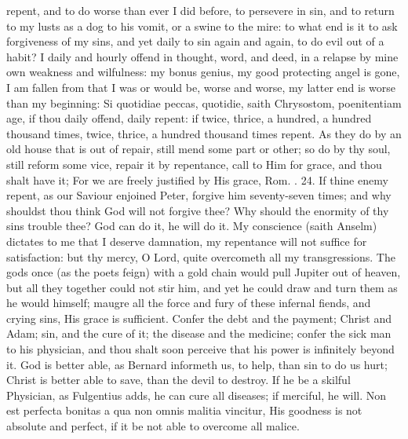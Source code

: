 {repent, and to do worse than ever I did before, to persevere in sin,
and to return to my lusts as a dog to his vomit, or a swine to the
mire: to what end is it to ask forgiveness of my sins, and yet
daily to sin again and again, to do evil out of a habit? I daily and
hourly offend in thought, word, and deed, in a relapse by mine own
weakness and wilfulness: my bonus genius, my good protecting angel is
gone, I am fallen from that I was or would be, worse and worse, my
latter end is worse than my beginning: Si quotidiae peccas, quotidie,
saith Chrysostom, poenitentiam age, if thou daily offend, daily repent:
if twice, thrice, a hundred, a hundred thousand times, twice,
thrice, a hundred thousand times repent. As they do by an old house
that is out of repair, still mend some part or other; so do by thy
soul, still reform some vice, repair it by repentance, call to Him for
grace, and thou shalt have it; For we are freely justified by His
grace, Rom. . 24. If thine enemy repent, as our Saviour enjoined
Peter, forgive him seventy-seven times; and why shouldst thou think God
will not forgive thee? Why should the enormity of thy sins trouble
thee? God can do it, he will do it. My conscience (saith Anselm)
dictates to me that I deserve damnation, my repentance will not suffice
for satisfaction: but thy mercy, O Lord, quite overcometh all my
transgressions. The gods once (as the poets feign) with a gold chain
would pull Jupiter out of heaven, but all they together could not stir
him, and yet he could draw and turn them as he would himself; maugre
all the force and fury of these infernal fiends, and crying sins, His
grace is sufficient. Confer the debt and the payment; Christ and Adam;
sin, and the cure of it; the disease and the medicine; confer the sick
man to his physician, and thou shalt soon perceive that his power is
infinitely beyond it. God is better able, as Bernard informeth
us, to help, than sin to do us hurt; Christ is better able to save,
than the devil to destroy. If he be a skilful Physician, as
Fulgentius adds, he can cure all diseases; if merciful, he will. Non
est perfecta bonitas a qua non omnis malitia vincitur, His goodness is
not absolute and perfect, if it be not able to overcome all malice.

}
